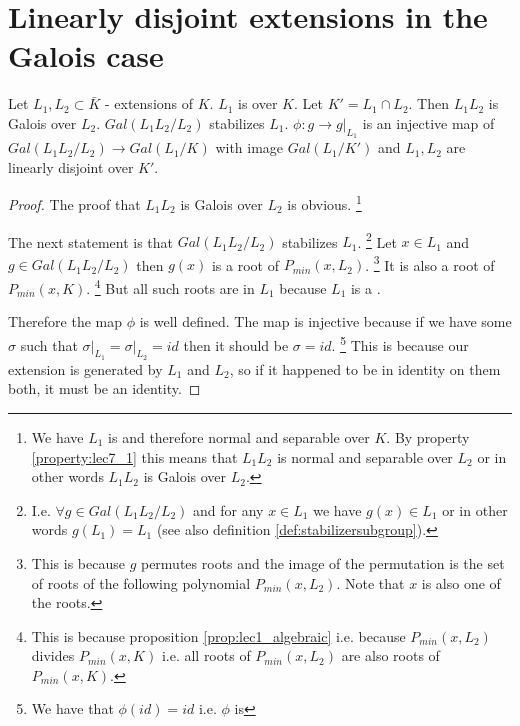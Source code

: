 \section{Linearly disjoint extensions in the Galois case}

\begin{theorem}
  Let $L_1, L_2 \subset \bar{K}$ - extensions of $K$. $L_1$ is
  over $K$. Let $K' = L_1 \cap L_2$. Then $L_1 L_2$ is Galois over
  $L_2$.
  $Gal\left(L_1 L_2/ L_2\right)$ stabilizes $L_1$. $\phi: g \to
  \left.g\right|_{L_1}$ is an injective map of
  $Gal\left(L_1 L_2/ L_2\right) \to Gal\left(L_1/ K\right)$ with
  image $Gal\left(L_1/K'\right)$ and $L_1, L_2$ are linearly disjoint
  over $K'$.
  \begin{proof}
    The proof that $L_1 L_2$ is Galois over $L_2$ is obvious.
    \footnote{
      We have $L_1$ is  and therefore
      normal and separable over $K$. By property \ref{property:lec7_1}
      this means that $L_1 L_2$ is normal and separable over $L_2$ or in
      other words $L_1 L_2$ is Galois over $L_2$.
    }

    The next statement is that $Gal\left(L_1 L_2/ L_2\right)$
    stabilizes
    $L_1$.
    \footnote{
      I.e. $\forall g \in Gal\left(L_1 L_2/ L_2\right)$  and for
      any $x \in L_1$ we have $g(x) \in L_1$ or in other words $g(L_1)
      = L_1$ (see also definition \ref{def:stabilizersubgroup}).
    }
    Let $x \in L_1$ and $g \in Gal\left(L_1 L_2/
    L_2\right)$ then 
    $g\left(x\right)$ is a root of $P_{min}\left(x, L_2\right)$.
    \footnote{
      This is because $g$ permutes roots and the image of the
      permutation is the set of roots of the following polynomial
      $P_{min}\left(x, L_2\right)$. Note that $x$ is also one of the
      roots.  
    }
    It is
    also a root of $P_{min}\left(x, K\right)$.
    \footnote{
      This is because proposition \ref{prop:lec1_algebraic} i.e. because
       $P_{min}\left(x, L_2\right)$ divides  $P_{min}\left(x,
      K\right)$ i.e. all roots of $P_{min}\left(x, L_2\right)$ are
      also roots of $P_{min}\left(x, K\right)$.
    }
    But all such roots are
    in $L_1$ because $L_1$ is a . 

    Therefore the map $\phi$ is well
    defined. The map is injective because if we have some $\sigma$ such that
    $\left. \sigma \right|_{L_1} = \left. \sigma \right|_{L_2} = id$
    then it should be $\sigma = id$.
    \footnote{
      We have that $\phi(id) = id$ i.e. $\phi$ is 
    }
    This is because our extension is
    generated by $L_1$ and $L_2$, so if it happened to be in identity
    on them both, it must be an identity.


\end{proof}
\end{theorem}
